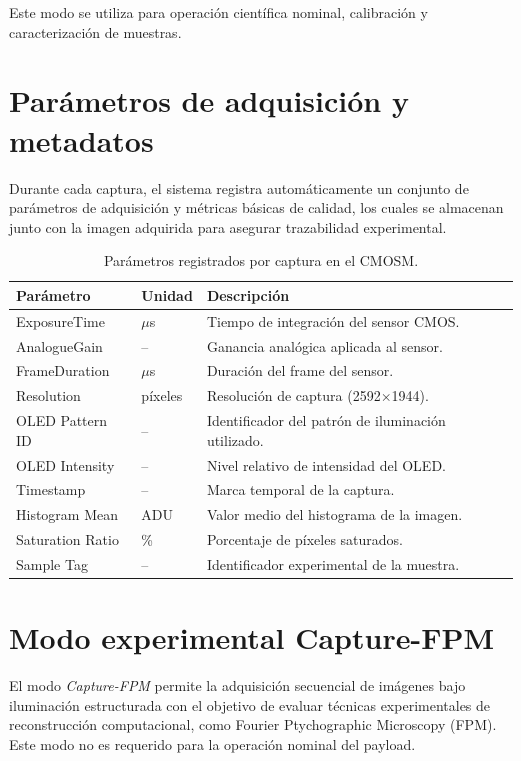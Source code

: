 Este modo se utiliza para operación científica nominal, calibración y
caracterización de muestras.

\section{Parámetros de adquisición y metadatos}

Durante cada captura, el sistema registra automáticamente un conjunto de
parámetros de adquisición y métricas básicas de calidad, los cuales se almacenan
junto con la imagen adquirida para asegurar trazabilidad experimental.

\begin{table}[H]
\centering
\begin{tabular}{p{4cm} p{3cm} p{7cm}}
\toprule
\textbf{Parámetro} & \textbf{Unidad} & \textbf{Descripción} \\
\midrule
ExposureTime & $\mu$s & Tiempo de integración del sensor CMOS. \\
AnalogueGain & -- & Ganancia analógica aplicada al sensor. \\
FrameDuration & $\mu$s & Duración del frame del sensor. \\
Resolution & píxeles & Resolución de captura (2592$\times$1944). \\
OLED Pattern ID & -- & Identificador del patrón de iluminación utilizado. \\
OLED Intensity & -- & Nivel relativo de intensidad del OLED. \\
Timestamp & -- & Marca temporal de la captura. \\
Histogram Mean & ADU & Valor medio del histograma de la imagen. \\
Saturation Ratio & \% & Porcentaje de píxeles saturados. \\
Sample Tag & -- & Identificador experimental de la muestra. \\
\bottomrule
\end{tabular}
\caption{Parámetros registrados por captura en el CMOSM.}
\end{table}

\section{Modo experimental Capture-FPM}

El modo \textit{Capture-FPM} permite la adquisición secuencial de imágenes bajo
iluminación estructurada con el objetivo de evaluar técnicas experimentales de
reconstrucción computacional, como Fourier Ptychographic Microscopy (FPM). Este
modo no es requerido para la operación nominal del payload.


